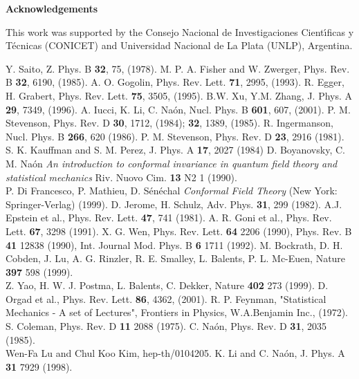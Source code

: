 \documentclass[a4paper,12pt]{article}
\begin{document}
{\bf Acknowledgements}

This work was supported by the Consejo Nacional de Investigaciones Cient\'{\i}ficas y
T\'ecnicas (CONICET) and Universidad Nacional de La Plata (UNLP), Argentina.
\newpage
\begin{thebibliography}{<99>}

 Y. Saito, Z. Phys. B {\bf 32}, 75, (1978).
 M. P. A. Fisher and W. Zwerger, Phys. Rev. B {\bf 32}, 6190, (1985).
A. O. Gogolin, Phys. Rev. Lett. {\bf 71}, 2995, (1993).
 R. Egger, H. Grabert, Phys. Rev. Lett. {\bf 75}, 3505, (1995).
 B.W. Xu, Y.M. Zhang, J. Phys. A {\bf 29}, 7349, (1996).
A. Iucci, K. Li, C. Na\'on, Nucl. Phys. B {\bf 601}, 607, (2001).
P. M. Stevenson, Phys. Rev. D {\bf 30}, 1712,
(1984); {\bf 32}, 1389, (1985).
R. Ingermanson, Nucl. Phys. B {\bf 266}, 620 (1986).
P. M. Stevenson, Phys. Rev. D {\bf 23}, 2916
(1981).\\ S. K. Kauffman and S. M. Perez, J. Phys. A {\bf 17},
2027 (1984)
D. Boyanovsky, C. M. Na\'on  {\it An introduction to conformal invariance
in quantum field theory and statistical mechanics} Riv. Nuovo Cim.
{\bf 13} N2 1 (1990).\\P. Di Francesco, P. Mathieu, D.
S\'en\'echal  {\it Conformal Field Theory} (New York:
Springer-Verlag) (1999).
 D. Jerome, H. Schulz, Adv. Phys. {\bf31}, 299 (1982).
 A.J. Epstein et al., Phys. Rev. Lett. {\bf47}, 741
(1981).
 A. R. Goni et al., Phys. Rev. Lett. {\bf67},
3298 (1991).
 X. G. Wen, Phys. Rev. Lett. {\bf 64} 2206 (1990),
Phys. Rev. B {\bf 41} 12838 (1990), Int. Journal Mod. Phys. B {\bf 6} 1711 (1992).
 M. Bockrath, D. H. Cobden, J. Lu, A. G. Rinzler, R. E. Smalley, L. Balents,
P. L. Mc-Euen, Nature {\bf 397} 598 (1999).\\ Z. Yao, H. W. J. Postma, L. Balents, C.
Dekker, Nature {\bf 402} 273 (1999).
 D. Orgad et al., Phys. Rev. Lett. {\bf 86}, 4362, (2001).
 R. P. Feynman, "Statistical Mechanics - A set of Lectures",
Frontiers in Physics, W.A.Benjamin Inc., (1972).
 S. Coleman, Phys. Rev. D {\bf 11} 2088 (1975).
 C. Na\'on, Phys. Rev. D {\bf31}, 2035 (1985).\\ Wen-Fa Lu and Chul Koo Kim, hep-th/0104205.
 K. Li and C. Na\'on, J. Phys. A {\bf 31} 7929 (1998).

\end{thebibliography}
\end{document}
